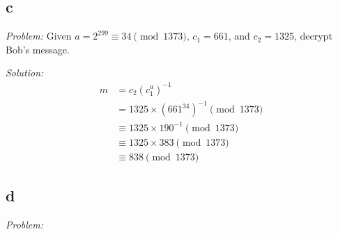 \documentclass[12pt]{article}
\begin{document}
\subsection*{c}
\textit{Problem:} Given $a = 2^299 \equiv 34 \pmod{1373}$, $c_1 = 661$, and $c_2 = 1325$, decrypt Bob's message.

\textit{Solution:}
\begin{align*}
    m &= c_2 (c_1^a)^{-1} \\
    &= 1325 \times (661^{34})^{-1} \pmod{1373} \\
    &\equiv 1325 \times 190^{-1} \pmod{1373} \\
    &\equiv 1325 \times 383 \pmod{1373} \\
    &\equiv \boxed{838} \pmod{1373}
\end{align*}

\subsection*{d}
\textit{Problem:}
\end{document}
